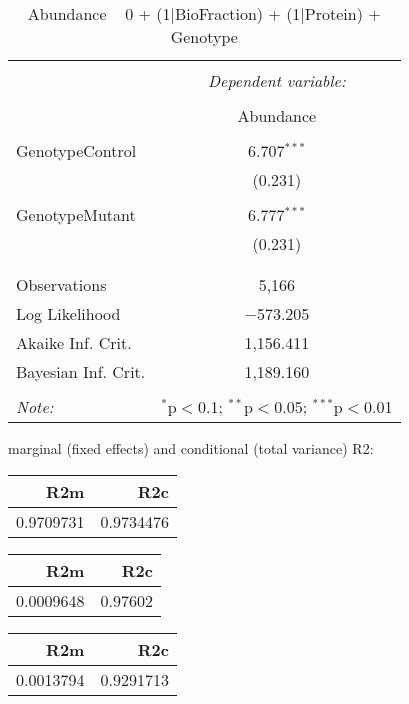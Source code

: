 \documentclass[11pt]{report}
\begin{document}
\begin{table}[!htbp] \centering 
  \caption{Abundance ~ 0 + (1|BioFraction) + (1|Protein) + Genotype} 
  \label{} 
\begin{tabular}{@{\extracolsep{5pt}}lc} 
\\[-1.8ex]\hline 
\hline \\[-1.8ex] 
 & \multicolumn{1}{c}{\textit{Dependent variable:}} \\ 
\cline{2-2} 
\\[-1.8ex] & Abundance \\ 
\hline \\[-1.8ex] 
 GenotypeControl & 6.707$^{***}$ \\ 
  & (0.231) \\ 
  & \\ 
 GenotypeMutant & 6.777$^{***}$ \\ 
  & (0.231) \\ 
  & \\ 
\hline \\[-1.8ex] 
Observations & 5,166 \\ 
Log Likelihood & $-$573.205 \\ 
Akaike Inf. Crit. & 1,156.411 \\ 
Bayesian Inf. Crit. & 1,189.160 \\ 
\hline 
\hline \\[-1.8ex] 
\textit{Note:}  & \multicolumn{1}{r}{$^{*}$p$<$0.1; $^{**}$p$<$0.05; $^{***}$p$<$0.01} \\ 
\end{tabular} 
\end{table} 
marginal (fixed effects) and conditional (total variance) R2:

\begin{tabular}{r|r}
\hline
R2m & R2c\\
\hline
0.9709731 & 0.9734476\\
\hline
\end{tabular}

\begin{tabular}{r|r}
\hline
R2m & R2c\\
\hline
0.0009648 & 0.97602\\
\hline
\end{tabular}

\begin{tabular}{r|r}
\hline
R2m & R2c\\
\hline
0.0013794 & 0.9291713\\
\hline
\end{tabular}
\end{document}

